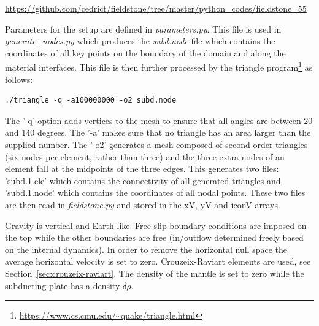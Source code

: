 \url{https://github.com/cedrict/fieldstone/tree/master/python_codes/fieldstone_55}

\vspace{1cm}

Parameters for the setup are defined in {\sl parameters.py}.
This file is used in {\sl generate\_nodes.py} which produces the
{\sl subd.node} file which contains the coordinates of all key points 
on the boundary of the domain and along the material interfaces.
This file is then further processed by the triangle 
program\footnote{\url{https://www.cs.cmu.edu/~quake/triangle.html}}
as follows:
\begin{verbatim}
./triangle -q -a100000000 -o2 subd.node
\end{verbatim}
The '-q' option adds vertices to the mesh to
ensure that all angles are between 20 and 140 degrees. 
The '-a' makes sure that no triangle has an area larger than 
the supplied number. The '-o2' generates a mesh composed 
of second order triangles (six nodes per element, rather than three) and the
three extra nodes of an element fall at the midpoints of the three edges.
This generates two files: 'subd.1.ele' which contains the connectivity 
of all generated triangles and 'subd.1.node' which contains the coordinates
of all nodal points. 
These two files are then read in {\sl fieldstone.py} and stored in the xV, yV and iconV arrays.

Gravity is vertical and Earth-like. Free-slip boundary conditions are imposed on the top while 
the other boundaries are free (in/outflow determined freely based on the internal dynamics). 
In order to remove the horizontal null space the average horizontal velocity is set to zero. 
Crouzeix-Raviart elements are used, see Section~\ref{sec:crouzeix-raviart}.
The density of the mantle is set to zero while the subducting plate has a density $\delta\rho$. 

